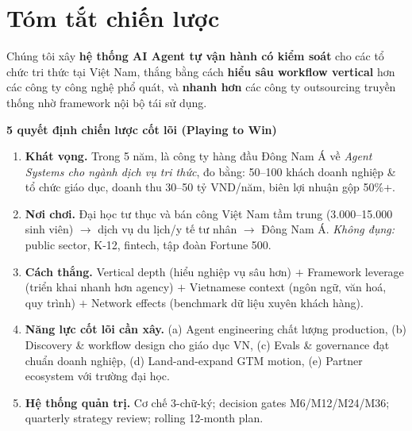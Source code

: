 \documentclass[11pt,a4paper]{article}
\begin{document}
\tableofcontents
\clearpage

\section*{Tóm tắt chiến lược}

\begin{keybox}[title=Chiến lược một câu]
Chúng tôi xây \textbf{hệ thống AI Agent tự vận hành có kiểm soát} cho các tổ chức
tri thức tại Việt Nam, thắng bằng cách \textbf{hiểu sâu workflow vertical} hơn các
công ty công nghệ phổ quát, và \textbf{nhanh hơn} các công ty outsourcing truyền thống
nhờ framework nội bộ tái sử dụng.
\end{keybox}

\textbf{5 quyết định chiến lược cốt lõi (Playing to Win)}

\begin{enumerate}
\item \textbf{Khát vọng.} Trong 5 năm, là công ty hàng đầu Đông Nam Á về \textit{Agent
Systems cho ngành dịch vụ tri thức}, đo bằng: 50--100 khách doanh nghiệp \& tổ
chức giáo dục, doanh thu 30--50 tỷ VND/năm, biên lợi nhuận gộp 50\%+.

\item \textbf{Nơi chơi.} Đại học tư thục và bán công Việt Nam tầm trung
(3.000--15.000 sinh viên) $\to$ dịch vụ du lịch/y tế tư nhân $\to$ Đông Nam Á.
\textit{Không đụng:} public sector, K-12, fintech, tập đoàn Fortune 500.

\item \textbf{Cách thắng.} Vertical depth (hiểu nghiệp vụ sâu hơn) $+$ Framework
leverage (triển khai nhanh hơn agency) $+$ Vietnamese context (ngôn ngữ, văn hoá,
quy trình) $+$ Network effects (benchmark dữ liệu xuyên khách hàng).

\item \textbf{Năng lực cốt lõi cần xây.} (a) Agent engineering chất lượng
production, (b) Discovery \& workflow design cho giáo dục VN, (c) Evals \&
governance đạt chuẩn doanh nghiệp, (d) Land-and-expand GTM motion, (e) Partner
ecosystem với trường đại học.

\item \textbf{Hệ thống quản trị.} Cơ chế 3-chữ-ký; decision gates M6/M12/M24/M36;
quarterly strategy review; rolling 12-month plan.
\end{enumerate}
\end{document}
